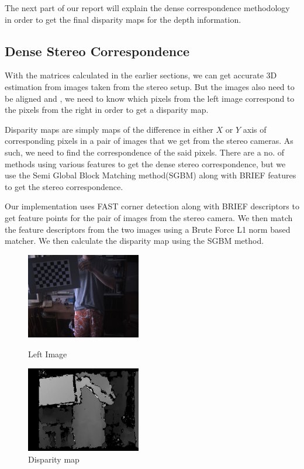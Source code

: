 \documentclass[11pt]{report}
\begin{document}
The next part of our report will explain the dense correspondence methodology in order to get the final disparity maps for the depth information.

\newpage
\subsection{Dense Stereo Correspondence}

With the matrices calculated in the earlier sections, we can get accurate 3D estimation from images taken from the stereo setup. But the images also need to be aligned and , we need to know which pixels from the left image correspond to the pixels from the right in order to get a disparity map. 

Disparity maps are simply maps of the difference in either $X$ or $Y$ axis of corresponding pixels in a pair of images that we get from the stereo cameras. As such, we need to find the correspondence of the said pixels. There are a no. of methods using various features to get the dense stereo correspondence, but we use the Semi Global Block Matching method(SGBM)\cite{hirschmuller2008stereo} along with BRIEF features\cite{brief} to get the stereo correspondence.

Our implementation uses FAST corner detection\cite{rosten_2006_machine} along with BRIEF descriptors to get feature points for the pair of images from the stereo camera. We then match the feature descriptors from the two images using a Brute Force L1 norm based matcher. We then calculate the disparity map using the SGBM method. 



\begin{figure}
\centering
\parbox{5cm}{
\includegraphics[width=5cm]{left.jpg}
\caption{Left Image}
\label{fig:2figsA}}
\qquad
\begin{minipage}{5cm}
\includegraphics[width=5cm]{disp.jpg}
\caption{Disparity map}
\label{fig:2figsB}
\end{minipage}
\end{figure}
\end{document}
